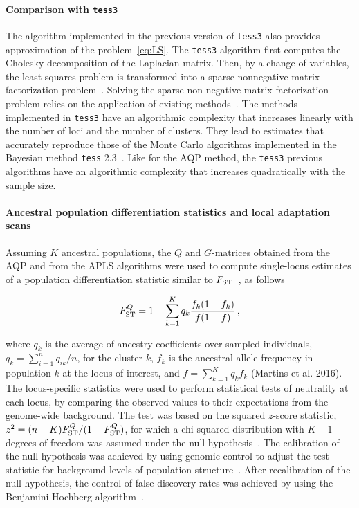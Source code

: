 \paragraph{Comparison with {\tt tess3}}  The algorithm implemented in the previous version of {\tt tess3} also provides approximation of the problem~\eqref{eq:LS}. The {\tt tess3} algorithm first computes the Cholesky decomposition of the Laplacian matrix. Then, by a change of variables, the least-squares problem is transformed into a sparse nonnegative matrix factorization problem~\citep{Caye2016}.  Solving the sparse non-negative matrix factorization problem relies on the application of existing methods~\citep{Kim2011, Frichot2014}. The methods implemented in {\tt tess3} have an algorithmic complexity that increases linearly with the number of loci and the number of clusters. They lead to estimates that accurately reproduce those of the Monte Carlo algorithms implemented in the Bayesian method {\tt tess} 2.3~\citep{Caye2016}. Like for the AQP method, the {\tt tess3} previous algorithms have an algorithmic complexity that increases quadratically with the sample size. 




\paragraph{Ancestral population differentiation statistics and local adaptation scans} Assuming $K$ ancestral populations, the $Q$ and $G$-matrices  obtained from the AQP and from the APLS algorithms were used to compute single-locus estimates of a population differentiation statistic similar to $F_{\rm ST}$~\citep{Martins2016}, as follows

$$
F^{Q}_{\rm ST} = 1 - \sum_{k=1}^K  q_k \frac{f_k (1-f_k)}{f(1-f)} \, ,
$$

\noindent where $q_k$ is the average of ancestry coefficients over sampled individuals, $q_k = \sum_{i =1}^n q_{ik}/n$, for the cluster $k$, $f_k$ is the ancestral allele frequency in population $k$ at the locus of interest, and $f = \sum_{k = 1}^K q_k f_k$ (Martins et al. 2016). The locus-specific statistics were used to perform statistical tests of neutrality at each locus, by comparing the observed values to their expectations from the genome-wide background. The test was based on the squared $z$-score statistic, $z^2 = (n-K) F^{Q}_{\rm ST}/(1 - F^{Q}_{\rm ST})$, for which a  chi-squared distribution with $K-1$ degrees of freedom was assumed under the null-hypothesis~\citep{Martins2016}. The calibration of the null-hypothesis was achieved by using genomic control to adjust the test statistic for background levels of population structure~\citep{Devlin1999, Francois2016}. After recalibration of the null-hypothesis, the control of false discovery rates was achieved by using the Benjamini-Hochberg algorithm~\citep{Benjamini1995}.


